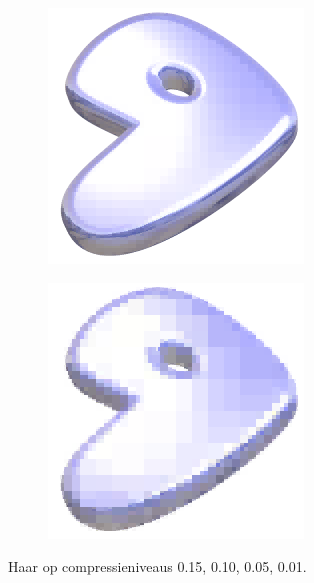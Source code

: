 \documentclass[11pt]{report}
\theoremstyle{plain}
\theoremstyle{remark}
\begin{document}
\begin{figure}
\begin{subfigure}[b]{0.24\textwidth}
	\end{subfigure}
	\begin{subfigure}[b]{0.24\textwidth}
		\centering
		\includegraphics[width=\textwidth]{plaatjes/gentoo_haar_0_05.png}
	\end{subfigure}
	\begin{subfigure}[b]{0.24\textwidth}
		\centering
		\includegraphics[width=\textwidth]{plaatjes/gentoo_haar_0_01.png}
	\end{subfigure}	
	\caption{Haar op compressieniveaus 0.15, 0.10, 0.05, 0.01.}
\end{figure}
\end{document}
